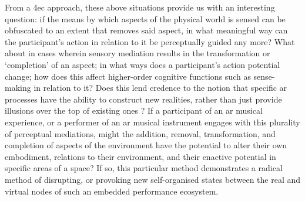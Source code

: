 From a \gls{4ec} approach, these above situations provide us with an interesting question: if the means by which aspects of the physical world is sensed can be obfuscated to an extent that removes said aspect, in what meaningful way can the participant's action in relation to it be perceptually guided any more? What about in cases wherein sensory mediation results in the transformation or `completion' of an aspect; in what ways does a participant's action potential change; how does this affect higher-order cognitive functions such as sense-making in relation to it? Does this lend credence to the notion that specific \gls{ar} processes have the ability to construct new realities, rather than just provide illusions over the top of existing ones \citep[p. 230]{chalmers2022}? If a participant of an \gls{ar} musical experience, or a performer of an \gls{ar} musical instrument engages with this plurality of perceptual mediations, might the addition, removal, transformation, and completion of aspects of the environment have the potential to alter their own embodiment, relations to their environment, and their enactive potential in specific areas of a space? If so, this particular method demonstrates a radical method of disrupting, or provoking new self-organised states between the real and virtual nodes of such an embedded performance ecosystem.

